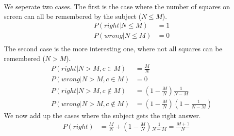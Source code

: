 We seperate two cases. The first is the case where the number of squares on screen can all be remembered by the subject ($N \leq M$).
\begin{align}
&&P(right | N \leq M) &= 1 \\
&&P(wrong | N \leq M) &= 0 \\
\end{align}
The second case is the more interesting one, where not all squares can be remembered ($N > M$).
\begin{align}
&&P(right | N > M, c \in M) &= \frac{M}{N} \\
&&P(wrong | N > M, c \in M) &= 0 \\
&&P(right | N > M, c \notin M) &= (1 - \frac{M}{N}) \frac{1}{N-M} \\
&&P(wrong | N > M, c \notin M) &= (1 - \frac{M}{N}) (1 - \frac{1}{N-M})
\end{align}
We now add up the cases where the subject  gets the right answer.
\begin{align}
P(right) &= \frac{M}{N} + (1 - \frac{M}{N}) \frac{1}{N-M} = \frac{M+1}{N}
\end{align}

